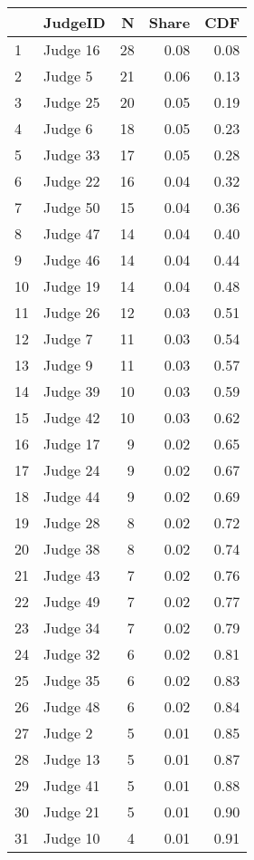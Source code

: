 \begin{tabular}{llrrr}
\toprule
{} &   JudgeID &   N &  Share &  CDF \\
\midrule
1  &  Judge 16 &  28 &   0.08 & 0.08 \\
2  &   Judge 5 &  21 &   0.06 & 0.13 \\
3  &  Judge 25 &  20 &   0.05 & 0.19 \\
4  &   Judge 6 &  18 &   0.05 & 0.23 \\
5  &  Judge 33 &  17 &   0.05 & 0.28 \\
6  &  Judge 22 &  16 &   0.04 & 0.32 \\
7  &  Judge 50 &  15 &   0.04 & 0.36 \\
8  &  Judge 47 &  14 &   0.04 & 0.40 \\
9  &  Judge 46 &  14 &   0.04 & 0.44 \\
10 &  Judge 19 &  14 &   0.04 & 0.48 \\
11 &  Judge 26 &  12 &   0.03 & 0.51 \\
12 &   Judge 7 &  11 &   0.03 & 0.54 \\
13 &   Judge 9 &  11 &   0.03 & 0.57 \\
14 &  Judge 39 &  10 &   0.03 & 0.59 \\
15 &  Judge 42 &  10 &   0.03 & 0.62 \\
16 &  Judge 17 &   9 &   0.02 & 0.65 \\
17 &  Judge 24 &   9 &   0.02 & 0.67 \\
18 &  Judge 44 &   9 &   0.02 & 0.69 \\
19 &  Judge 28 &   8 &   0.02 & 0.72 \\
20 &  Judge 38 &   8 &   0.02 & 0.74 \\
21 &  Judge 43 &   7 &   0.02 & 0.76 \\
22 &  Judge 49 &   7 &   0.02 & 0.77 \\
23 &  Judge 34 &   7 &   0.02 & 0.79 \\
24 &  Judge 32 &   6 &   0.02 & 0.81 \\
25 &  Judge 35 &   6 &   0.02 & 0.83 \\
26 &  Judge 48 &   6 &   0.02 & 0.84 \\
27 &   Judge 2 &   5 &   0.01 & 0.85 \\
28 &  Judge 13 &   5 &   0.01 & 0.87 \\
29 &  Judge 41 &   5 &   0.01 & 0.88 \\
30 &  Judge 21 &   5 &   0.01 & 0.90 \\
31 &  Judge 10 &   4 &   0.01 & 0.91 \\

\end{tabular}
